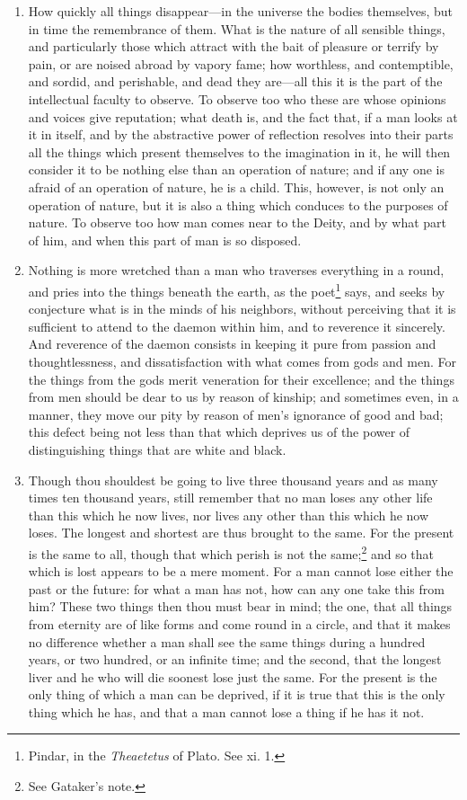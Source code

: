 \begin{enumerate}
\item How quickly all things disappear—in the universe the bodies themselves, but in time the remembrance of them. What is the nature of all sensible things, and particularly those which attract with the bait of pleasure or terrify by pain, or are noised abroad by vapory fame; how worthless, and contemptible, and sordid, and perishable, and dead they are—all this it is the part of the intellectual faculty to observe. To observe too who these are whose opinions and voices give reputation; what death is, and the fact that, if a man looks at it in itself, and by the abstractive power of reflection resolves into their parts all the things which present themselves to the imagination in it, he will then consider it to be nothing else than an operation of nature; and if any one is afraid of an operation of nature, he is a child. This, however, is not only an operation of nature, but it is also a thing which conduces to the purposes of nature. To observe too how man comes near to the Deity, and by what part of him, and when this part of man is so disposed.

\item Nothing is more wretched than a man who traverses everything in a round, and pries into the things beneath the earth, as the poet\footnote{Pindar, in the \textit{Theaetetus} of Plato. See xi. 1.} says, and seeks by conjecture what is in the minds of his neighbors, without perceiving that it is sufficient to attend to the daemon within him, and to reverence it sincerely. And reverence of the daemon consists in keeping it pure from passion and thoughtlessness, and dissatisfaction with what comes from gods and men. For the things from the gods merit veneration for their excellence; and the things from men should be dear to us by reason of kinship; and sometimes even, in a manner, they move our pity by reason of men's ignorance of good and bad; this defect being not less than that which deprives us of the power of distinguishing things that are white and black.

\item Though thou shouldest be going to live three thousand years and as many times ten thousand years, still remember that no man loses any other life than this which he now lives, nor lives any other than this which he now loses. The longest and shortest are thus brought to the same. For the present is the same to all, though that which perish is not the same;\footnote{See Gataker's note.} and so that which is lost appears to be a mere moment. For a man cannot lose either the past or the future: for what a man has not, how can any one take this from him? These two things then thou must bear in mind; the one, that all things from eternity are of like forms and come round in a circle, and that it makes no difference whether a man shall see the same things during a hundred years, or two hundred, or an infinite time; and the second, that the longest liver and he who will die soonest lose just the same. For the present is the only thing of which a man can be deprived, if it is true that this is the only thing which he has, and that a man cannot lose a thing if he has it not.


\end{enumerate}
